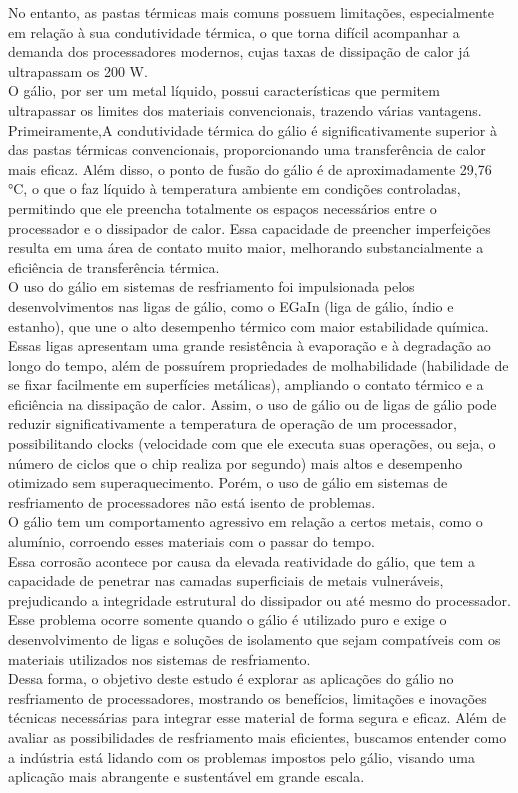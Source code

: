 \documentclass[12pt]{article}
\begin{document}
No entanto, as pastas térmicas mais comuns possuem limitações, especialmente em relação à sua condutividade térmica, o que torna difícil acompanhar a demanda dos processadores modernos, cujas taxas de dissipação de calor já ultrapassam os 200 W.
\\
O gálio, por ser um metal líquido, possui características que permitem ultrapassar os limites dos materiais convencionais, trazendo várias vantagens. Primeiramente,A condutividade térmica do gálio é significativamente superior à das pastas térmicas convencionais, proporcionando uma transferência de calor mais eficaz. Além disso, o ponto de fusão do gálio é de aproximadamente 29,76 °C, o que o faz líquido à temperatura ambiente em condições controladas, permitindo que ele preencha totalmente os espaços necessários entre o processador e o dissipador de calor. Essa capacidade de preencher imperfeições resulta em uma área de contato muito maior, melhorando substancialmente a eficiência de transferência térmica.
\\
O uso do gálio em sistemas de resfriamento foi impulsionada pelos desenvolvimentos nas ligas de gálio, como o EGaIn (liga de gálio, índio e estanho), que une o alto desempenho térmico com maior estabilidade química. Essas ligas apresentam uma grande resistência à evaporação e à degradação ao longo do tempo, além de possuírem propriedades de molhabilidade (habilidade de se fixar facilmente em superfícies metálicas), ampliando o contato térmico e a eficiência na dissipação de calor. Assim, o uso de gálio ou de ligas de gálio pode reduzir significativamente a temperatura de operação de um processador, possibilitando clocks (velocidade com que ele executa suas operações, ou seja, o número de ciclos que o chip realiza por segundo) mais altos e desempenho otimizado sem superaquecimento.
Porém, o uso de gálio em sistemas de resfriamento de processadores não está isento de problemas. 
\\
O gálio tem um comportamento agressivo em relação a certos metais, como o alumínio, corroendo esses materiais com o passar do tempo. 
\\
Essa corrosão acontece por causa da elevada reatividade do gálio, que tem a capacidade de penetrar nas camadas superficiais de metais vulneráveis, prejudicando a integridade estrutural do dissipador ou até mesmo do processador. 
\\
Esse problema ocorre somente quando o gálio é utilizado puro e exige o desenvolvimento de ligas e soluções de isolamento que sejam compatíveis com os materiais utilizados nos sistemas de resfriamento.
\\
Dessa forma, o objetivo deste estudo é explorar as aplicações do gálio no resfriamento de processadores, mostrando os benefícios, limitações e inovações técnicas necessárias para integrar esse material de forma segura e eficaz. Além de avaliar as possibilidades de resfriamento mais eficientes, buscamos entender como a indústria está lidando com os problemas impostos pelo gálio, visando uma aplicação mais abrangente e sustentável em grande escala.
\end{document}

